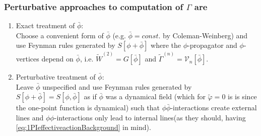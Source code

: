 \subsubsection{Perturbative approaches to computation of $\Gamma$ are}
\begin{enumerate}
	\item Exact treatment of $\bar{ \phi}$:\\
	Choose a convenient form of $\bar{\phi}$ (e.g. $\bar{\phi}=const.$ by Coleman-Weinberg) and use Feynman rules generated by $S[\phi+\bar{ \phi}]$ where the $\phi$-propagator and $\phi$-vertices depend on $\bar{\phi}$, i.e. $\tilde{W}^{(2)} = G[\bar{\phi}]$ and $\tilde{\Gamma}^{(n)} = \mathcal{V}_n[\bar{ \phi}]$.\\
	\item Perturbative treatment of $\bar{\phi}$:\\
		Leave $\bar{\phi}$ unspecified and use Feynman rules generated by $S[\phi+\bar{ \phi}]=S[\phi,\bar{ \phi}]$ as if $\bar{ \phi}$ was a dynamical field (which for $\tilde{\varphi}=0$ is is since the one-point function is dynamical) such that $\phi \bar{ \phi}$-interactions create external lines and $\phi \phi$-interactions only lead to internal lines(as they should, having \ref{eq:1PIeffectiveactionBackground} in mind).
	\end{enumerate}












